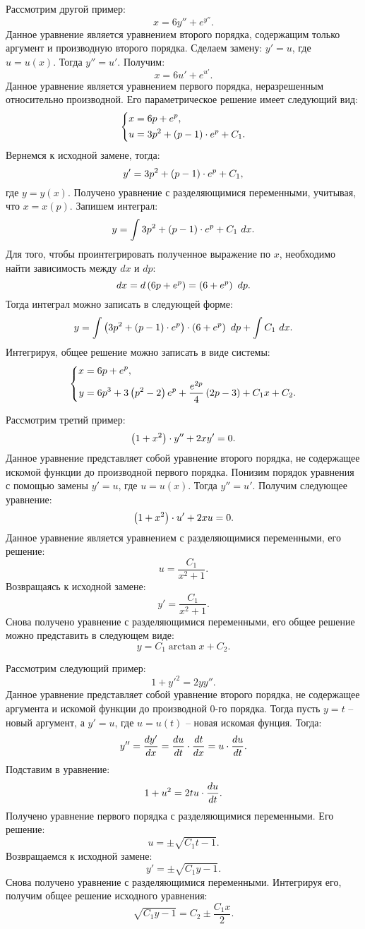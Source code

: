 		Рассмотрим другой пример:
		\[ x = 6y'' + e^{y''}. \]
		Данное уравнение является уравнением второго порядка, содержащим только аргумент и производную второго порядка. Сделаем замену: $y' = u$, где $u = u(x)$. Тогда $y'' = u'$. Получим:
		\[ x = 6u' + e^{u'}. \]
		Данное уравнение является уравнением первого порядка, неразрешенным относительно производной. Его параметрическое решение имеет следующий вид:
		\[ \left\lbrace \begin{split} 
			x &= 6p + e^p, \\
			u &= 3p^2 + \left( p-1 \right) \cdot e^p + C_1.
		\end{split} \right. \]
		Вернемся к исходной замене, тогда:
		\[ y' = 3p^2 + \left( p-1 \right) \cdot e^p + C_1, \]
		где $y = y(x)$. Получено уравнение с разделяющимися переменными, учитывая, что $x = x(p)$. Запишем интеграл:
		\[ y = \int 3p^2 + \left( p-1 \right) \cdot e^p + C_1 ~ dx. \]
		Для того, чтобы проинтегрировать полученное выражение по $x$, необходимо найти зависимость между $dx$ и $dp$:
		\[ dx = d \left( 6p + e^p \right) = \left( 6 + e^{p} \right) ~ dp. \]
		Тогда интеграл можно записать в следующей форме:
		\[ y = \int \left( 3p^2 + \left( p-1 \right) \cdot e^p \right) \cdot \left( 6 + e^p \right) ~ dp + \int C_1 ~ dx. \]
		Интегрируя, общее решение можно записать в виде системы:
		\[ \left\lbrace \begin{split} 
			x &= 6p + e^{p}, \\
			y &= 6p^3 + 3 \left( p^2 - 2 \right) e^{p} + \frac{e^{2p}}{4} \left( 2p - 3 \right) + C_1 x + C_2.
		\end{split} \right. \]

		Рассмотрим третий пример:
		\[ \left( 1 + x^2 \right) \cdot y'' + 2xy' = 0. \]
		Данное уравнение представляет собой уравнение второго порядка, не содержащее искомой функции до производной первого порядка. Понизим порядок уравнения с помощью замены $y' = u$, где $u = u(x)$. Тогда $y'' = u'$. Получим следующее уравнение:
		\[ \left( 1 + x^2 \right) \cdot u' + 2xu = 0. \]
		Данное уравнение является уравнением с разделяющимися переменными, его решение:
		\[ u = \frac{C_1}{x^2 + 1}. \]
		Возвращаясь к исходной замене:
		\[ y' = \frac{C_1}{x^2 + 1}. \]
		Снова получено уравнение с разделяющимися переменными, его общее решение можно представить в следующем виде:
		\[ y = C_1 \arctan{x} + C_2. \]

		Рассмотрим следующий пример:
		\[ 1 + y'^2 = 2yy''. \]
		Данное уравнение представляет собой уравнение второго порядка, не содержащее аргумента и искомой функции до производной $0$-го порядка. Тогда пусть $y = t$ -- новый аргумент, а $y' = u$, где $u = u(t)$ -- новая искомая фунция. Тогда:
		\[ y'' = \dfrac{d y'}{d x} = \dfrac{d u}{d t} \cdot \dfrac{d t}{d x} = u \cdot \dfrac{d u}{d t}. \]
		Подставим в уравнение:
		\[ 1 + u^2 = 2tu \cdot \dfrac{d u}{d t}. \]
		Получено уравнение первого порядка с разделяющимися переменными. Его решение:
		\[ u = \pm \sqrt{C_1 t - 1}. \]
		Возвращаемся к исходной замене:
		\[ y' = \pm \sqrt{C_1 y - 1}. \]
		Снова получено уравнение с разделяющимися переменными. Интегрируя его, получим общее решение исходного уравнения:
		\[ \sqrt{C_1 y - 1} = C_2 \pm \frac{C_1x}{2}. \]

